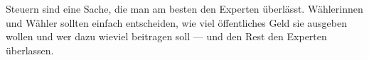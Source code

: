 Steuern sind eine Sache, die man am besten den Experten überlässt.
Wählerinnen und Wähler sollten einfach entscheiden, wie viel öffentliches Geld sie ausgeben wollen und wer dazu wieviel beitragen soll –-- und den Rest den Experten überlassen.